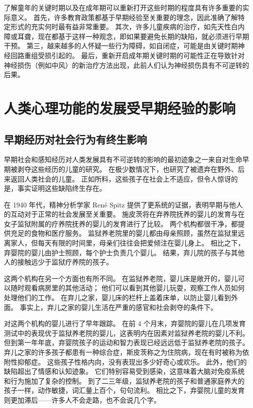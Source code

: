 了解童年的关键时期以及在成年期可以重新打开这些时期的程度具有许多重要的实际意义。
首先，许多教育政策都基于早期经验至关重要的理念，因此准确了解特定形式的充实何时最有益非常重要。
其次，许多儿童疾病的治疗，如先天性白内障或耳聋，现在都基于这样一种观念，即如果要避免长期的缺陷，就必须进行早期干预。
第三，越来越多的人怀疑一些行为障碍，如自闭症，可能是由关键时期神经回路重组受损引起的。
最后，重新开启成年期关键时期的可能性正在导致针对神经损伤（例如中风）的新治疗方法出现，此前人们认为神经损伤具有不可逆转的后果。



\section{人类心理功能的发展受早期经验的影响}

\subsection{早期经历对社会行为有终生影响}

早期社会和感知经历对人类发展具有不可逆转的影响的最初迹象之一来自对生命早期被剥夺这些经历的儿童的研究。
在极少数情况下，也研究了被遗弃在野外、后来返回人类社会的儿童。
正如所料，这些孩子在社会上不适应，但令人惊讶的是，事实证明这些缺陷终生存在。


在 1940 年代，精神分析学家 René Spitz 提供了更系统的证据，表明早期与他人的互动对于正常的社会发展至关重要。
施皮茨将在弃养院抚养的婴儿的发育与在女子监狱附属的疗养院抚养的婴儿的发育进行了比较。
两个机构都很干净，都提供充足的食物和医疗服务。
监狱养老院里的婴儿都由母亲照顾，虽然在监狱里远离家人，但每天有限的时间里，母亲们往往会把爱倾注在婴儿身上。
相比之下，弃婴院的婴儿由护士照顾，每个护士负责几个婴儿。
结果，弃儿院的孩子与其他人的接触远少于监狱疗养院的孩子。


这两个机构在另一个方面也有所不同。
在监狱养老院，婴儿床是敞开的，婴儿可以随时观看病房里的其他活动；
他们可以看到其他婴儿玩耍，观察工作人员如何处理他们的工作。
在弃儿之家，婴儿床的栏杆上盖着床单，以防止婴儿看到外面。
事实上，弃儿之家的婴儿生活在严重的感官和社会剥夺的条件下。


对这两个机构的婴儿进行了早年跟踪。
在前 4 个月末，弃婴院的婴儿在几项发育测试中的表现优于监狱养老院的婴儿，这表明内在因素对监狱养老院的婴儿不利。
但到第一年年底，弃婴院孩子的运动和智力表现已经远远低于监狱养老院的孩子。
弃儿之家的许多孩子都患有一种综合症，斯皮茨称之为住院病，现在有时被称为依附性抑郁症。
这些孩子性格内向，没有表现出多少好奇心或欢乐。 此外，他们的缺陷超出了情感和认知迹象。
它们特别容易受到感染，这意味着大脑对免疫系统和行为施加了复杂的控制。
到了二三年级，监狱养老院的孩子和普通家庭养大的孩子一样，动作敏捷，词汇量上百个，句句流利。
相比之下，弃婴院儿童的发育则更加滞后——许多人不会走路，也不会说几个字。


